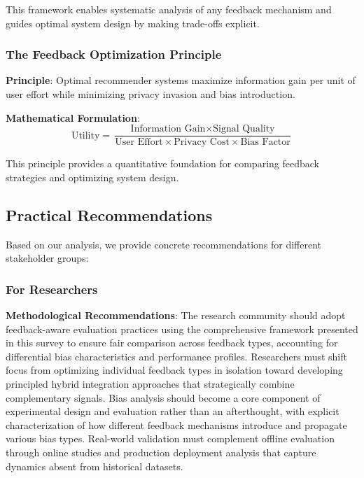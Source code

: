 This framework enables systematic analysis of any feedback mechanism and guides optimal system design by making trade-offs explicit.

\subsubsection{The Feedback Optimization Principle}
\textbf{Principle}: Optimal recommender systems maximize information gain per unit of user effort while minimizing privacy invasion and bias introduction.

\textbf{Mathematical Formulation}:
\begin{equation}
\text{Utility} = \frac{\text{Information Gain} \times \text{Signal Quality}}{\text{User Effort} \times \text{Privacy Cost} \times \text{Bias Factor}}
\end{equation}

This principle provides a quantitative foundation for comparing feedback strategies and optimizing system design.

\subsection{Practical Recommendations}

Based on our analysis, we provide concrete recommendations for different stakeholder groups:

\subsubsection{For Researchers}

\textbf{Methodological Recommendations}: The research community should adopt feedback-aware evaluation practices using the comprehensive framework presented in this survey to ensure fair comparison across feedback types, accounting for differential bias characteristics and performance profiles. Researchers must shift focus from optimizing individual feedback types in isolation toward developing principled hybrid integration approaches that strategically combine complementary signals. Bias analysis should become a core component of experimental design and evaluation rather than an afterthought, with explicit characterization of how different feedback mechanisms introduce and propagate various bias types. Real-world validation must complement offline evaluation through online studies and production deployment analysis that capture dynamics absent from historical datasets.

